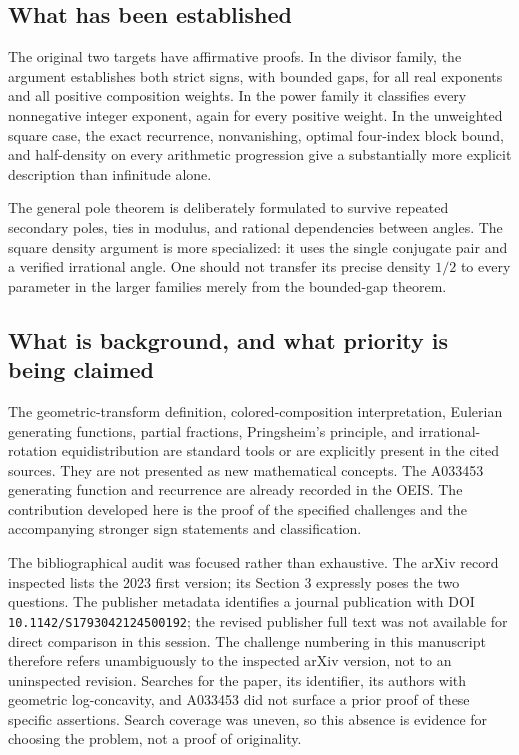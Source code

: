\documentclass[11pt,letterpaper]{article}
\theoremstyle{definition}
\numberwithin{equation}{section}
\begin{document}
\subsection{What has been established}

The original two targets have affirmative proofs. In the divisor family,
the argument establishes both strict signs, with bounded gaps, for
all real exponents and all positive composition weights. In the power
family it classifies every nonnegative integer exponent, again for every
positive weight. In the unweighted square case, the exact recurrence,
nonvanishing, optimal four-index block bound, and half-density on every
arithmetic progression give a substantially more explicit description
than infinitude alone.

The general pole theorem is deliberately formulated to survive repeated
secondary poles, ties in modulus, and rational dependencies between
angles. The square density argument is more specialized: it uses the
single conjugate pair and a verified irrational angle. One should not
transfer its precise density $1/2$ to every parameter in the larger
families merely from the bounded-gap theorem.

\subsection{What is background, and what priority is being claimed}

The geometric-transform definition, colored-composition interpretation,
Eulerian generating functions, partial fractions, Pringsheim's principle,
and irrational-rotation equidistribution are standard tools or are
explicitly present in the cited sources. They are not presented as new
mathematical concepts. The A033453 generating function and recurrence are
already recorded in the OEIS. The contribution developed here is the
proof of the specified challenges and the accompanying stronger sign
statements and classification.

The bibliographical audit was focused rather than exhaustive. The arXiv
record inspected lists the 2023 first version; its Section 3 expressly
poses the two questions. The publisher metadata identifies a journal
publication with DOI \texttt{10.1142/S1793042124500192}; the revised
publisher full text was not available for direct comparison in this
session. The challenge numbering in this manuscript therefore refers
unambiguously to the inspected arXiv version, not to an uninspected
revision. Searches for the paper, its identifier, its authors with
geometric log-concavity, and A033453 did not surface a prior proof of
these specific assertions. Search coverage was uneven, so this absence
is evidence for choosing the problem, not a proof of originality.
\end{document}
